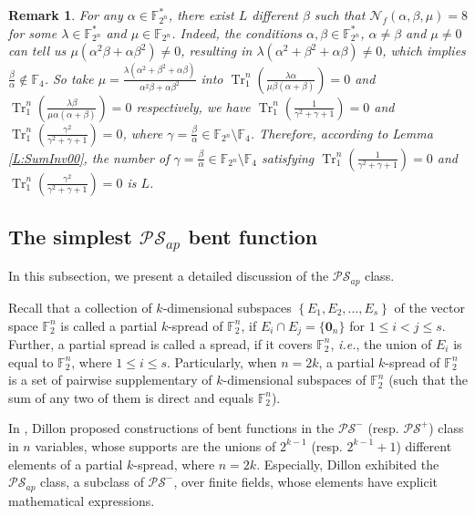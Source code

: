\documentclass{article}
\newcommand{\F}{\mathbb{F}}
\newcommand{\0}{\textbf{0}}
\newcommand{\1}{\textbf{1}}
\newcommand{\TrN}{\operatorname{Tr}_1^n}
\theoremstyle{plain}
\newtheorem{remark}{Remark}
\begin{document}
    \begin{remark}
        For any $\alpha\in\F_{2^n}^*$, there exist $L$ different $\beta$ 
        such that $\mathcal{N}_f(\alpha,\beta,\mu)=8$ for some $\lambda\in\F_{2^n}^*$ and $\mu\in\F_{2^n}$. 
        Indeed, the conditions $\alpha,\beta\in\F_{2^n}^*$, $\alpha\ne\beta$ and $\mu\ne 0$ 
        can tell us $\mu(\alpha^2\beta+\alpha\beta^2)\ne 0$, 
        resulting in $\lambda(\alpha^2+\beta^2+\alpha\beta)\ne 0$, 
        which implies $\frac{\beta}{\alpha}\notin\F_4$.
        So take $\mu=\frac{\lambda(\alpha^2+\beta^2+\alpha\beta)}{\alpha^2\beta+\alpha\beta^2}$ 
        into $\TrN\left(\frac{\lambda \alpha}{\mu \beta(\alpha+\beta)}\right)=0$ 
        and $\TrN\left(\frac{\lambda \beta}{\mu \alpha(\alpha+\beta)}\right)=0$ respectively, 
        we have $\TrN\left(\frac{1}{\gamma^2+\gamma+1}\right)=0$ and $\TrN\left(\frac{\gamma^2}{\gamma^2+\gamma+1}\right)=0$, 
        where $\gamma=\frac{\beta}{\alpha}\in\F_{2^n}\setminus\F_{4}$. 
        Therefore, according to Lemma \ref{L:SumInv00}, 
        the number of $\gamma=\frac{\beta}{\alpha}\in\F_{2^n}\setminus\F_{4}$ satisfying 
        $\TrN\left(\frac{1}{\gamma^2+\gamma+1}\right)=0$ and $\TrN\left(\frac{\gamma^2}{\gamma^2+\gamma+1}\right)=0$ 
        is $L$.
    \end{remark}
   
    \subsection{The simplest $\mathcal{PS}_{ap}$ bent function}
    In this subsection, we present a detailed discussion of the $\mathcal{PS}_{ap}$ class. 

    Recall that a collection of $k$-dimensional subspaces $\left\{ E_1,E_2,\dots,E_s \right\}$ of the vector space $\F_2^n$ is called a partial $k$-spread of $\F_2^n$, if $E_i\cap E_j = \{\bm{0}_n\}$ for $1\le i<j\le s$. 
    Further, a partial spread is called a spread, if it covers $\F_2^n$, \emph{i.e.}, the union of $E_i$ is equal to $\F_2^n$, where $1\le i\le s$. 
    Particularly, when $n=2k$, a partial $k$-spread of $\F_2^n$ is a set of pairwise supplementary of $k$-dimensional subspaces of $\F_2^n$ (such that the sum of any two of them is direct and equals $\F_2^n$). 

    In \cite{Dillon1974PSbent}, Dillon proposed constructions of bent functions in the $\mathcal{PS}^-$ (resp. $\mathcal{PS}^+$) class in $n$ variables, whose supports are the unions of $2^{k-1}$ (resp. $2^{k-1}+1$) different elements of a partial $k$-spread, where $n=2k$.
    Especially, Dillon exhibited the $\mathcal{PS}_{ap}$ class, a subclass of $\mathcal{PS}^-$, over finite fields, whose elements have explicit mathematical expressions. 
    
\end{document}
